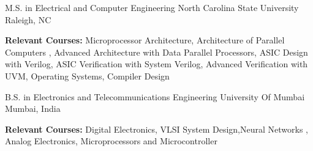 \par\addvspace{1ex}


\begin{cventries}

  \cventry
    {M.S. in Electrical and Computer Engineering} %
    {North Carolina State University} %
    {Raleigh, NC} %
    {\color{darkgray}{Aug. 2017 - Expected May. 2019}} %
    {
      \begin{cvitems} %
        \item \textbf{Relevant Courses:} {Microprocessor Architecture, Architecture of Parallel Computers , Advanced Architecture with Data Parallel Processors, ASIC Design with Verilog, ASIC Verification with System Verilog, Advanced Verification with UVM, Operating Systems, Compiler Design}
      \end{cvitems}
    }

    \cventry
    {B.S. in Electronics and Telecommunications Engineering} %
    {University Of Mumbai} %
    {Mumbai, India} %
    {\color{darkgray}{Aug. 2013 - May.2017}} %
    {
      \begin{cvitems} %
        \item \textbf{Relevant Courses:} {Digital Electronics, VLSI System Design,Neural Networks , Analog Electronics, Microprocessors and Microcontroller }
      \end{cvitems}
    }

\end{cventries}
